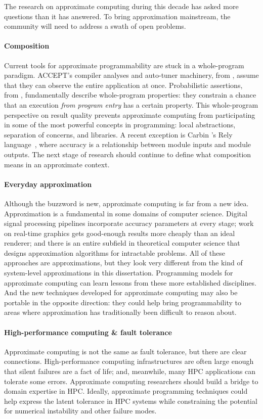 The research on approximate computing during this decade
has asked more questions than it has answered.
To bring approximation mainstream, the community will need to address a swath
of open problems.

\paragraph{Composition}
Current tools for approximate programmability are stuck in a
whole-program paradigm.
ACCEPT's compiler analyses and auto-tuner machinery, from ,
assume that they can observe the entire application at once.
Probabilistic assertions, from ,
fundamentally describe whole-program properties: they constrain a chance that
an execution \emph{from program entry} has a certain property.
This whole-program perspective on result quality prevents approximate
computing from participating in some of the most powerful concepts in
programming: local abstractions, separation of concerns, and libraries.
A recent exception is Carbin \etal's Rely language~\cite{rely},
where accuracy is a relationship between module inputs and module outputs.
The next stage of research should continue to define what composition means in
an approximate context.

\paragraph{Everyday approximation}
Although the buzzword is new, approximate computing is far from a new idea.
Approximation is a fundamental in some domains of computer science.
Digital signal processing pipelines incorporate accuracy parameters at every
stage;
work on real-time graphics gets good-enough results more cheaply than an ideal
renderer;
and there is an entire subfield in theoretical computer science that designs
approximation algorithms for intractable problems.
All of these approaches are approximations, but they look very different from
the kind of system-level approximations in this dissertation.
Programming models for approximate computing can learn lessons from these more
established disciplines.
And the new techniques developed for approximate computing may also be
portable in the opposite direction:
they could help bring programmability to areas where approximation has
traditionally been difficult to reason about.

\paragraph{High-performance computing \& fault tolerance}
Approximate computing is not the same as fault tolerance, but there are
clear connections.
High-performance computing infrastructures are often large enough that silent
failures are a fact of life;
and, meanwhile, many HPC applications can tolerate some errors.
Approximate computing researchers should build a bridge to domain expertise in
HPC\@.
Ideally, approximate programming techniques could help
express the latent tolerance in
HPC systems while constraining the potential for numerical instability and
other failure modes.


